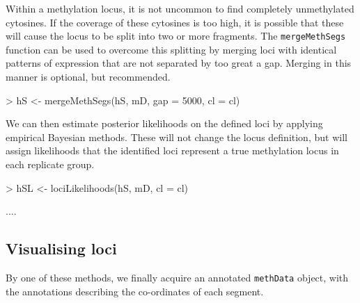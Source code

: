 \documentclass[a4paper]{article}
\begin{document}
Within a methylation locus, it is not uncommon to find completely unmethylated cytosines. If the coverage of these cytosines is too high, it is possible that these will cause the locus to be split into two or more fragments. The \verb'mergeMethSegs' function can be used to overcome this splitting by merging loci with identical patterns of expression that are not separated by too great a gap. Merging in this manner is optional, but recommended.

\begin{Schunk}
\begin{Sinput}
> hS <- mergeMethSegs(hS, mD, gap = 5000, cl = cl)
\end{Sinput}
\end{Schunk}

We can then estimate posterior likelihoods on the defined loci by applying empirical Bayesian methods. These will not change the locus definition, but will assign likelihoods that the identified loci represent a true methylation locus in each replicate group.

\begin{Schunk}
\begin{Sinput}
> hSL <- lociLikelihoods(hS, mD, cl = cl)
\end{Sinput}
\begin{Soutput}
....
\end{Soutput}
\end{Schunk}




\subsection*{Visualising loci}

By one of these methods, we finally acquire an annotated \verb'methData' object, with the annotations describing the co-ordinates of each segment.
\end{document}

